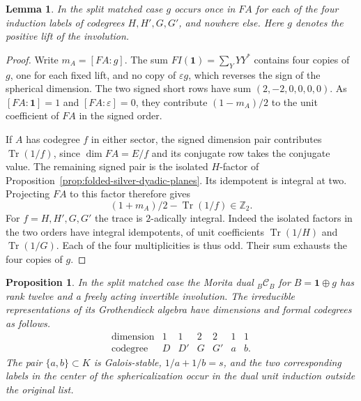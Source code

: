 \documentclass[11pt,reqno]{amsart}
\newtheorem{proposition}[theorem]{Proposition}
\newtheorem{lemma}[theorem]{Lemma}
\theoremstyle{remark}\newtheorem{remark}[theorem]{Remark}
\numberwithin{equation}{section}
\begin{document}
\begin{lemma}\label{prop:common-four-allocation}
In the split matched case $g$ occurs once in $F A$ for each of the
four induction labels of codegrees $H,H',G,G'$, and nowhere else.
Here $g$ denotes the positive lift of the involution.
\end{lemma}
\begin{proof}
Write $m_A=[FA:g]$. The sum $FI(\mathbf1)=\sum_Y YY^*$ contains
four copies of $g$, one for each fixed lift, and no copy of
$\varepsilon g$, which reverses the sign of the spherical dimension.
The two signed short rows have sum $(2,-2,0,0,0,0)$.
As $[FA:\mathbf1]=1$ and $[FA:\varepsilon]=0$, they contribute
$(1-m_A)/2$ to the unit coefficient of $FA$ in the signed order.

If $A$ has codegree $f$ in either sector, the signed dimension pair
contributes $\operatorname{Tr}(1/f)$, since $\dim FA=E/f$ and its
conjugate row takes the conjugate value. The remaining signed pair
is the isolated $H$-factor of
Proposition~\ref{prop:folded-silver-dyadic-planes}. Its idempotent
is integral at two. Projecting $FA$ to this factor therefore gives
\[
          (1+m_A)/2-\operatorname{Tr}(1/f)\in\mathbb Z_2 .
\]
For $f=H,H',G,G'$ the trace is $2$-adically integral. Indeed the
isolated factors in the two orders have integral idempotents, of
unit coefficients $\operatorname{Tr}(1/H)$ and $\operatorname{Tr}(1/G)$.
Each of the four multiplicities is thus odd. Their sum exhausts the
four copies of $g$.
\end{proof}

\begin{proposition}\label{prop:four-morita}
In the split matched case the Morita dual \({}_B\mathcal C_B\) for
$B=\mathbf1\oplus g$ has rank twelve and a freely acting invertible
involution. The irreducible representations of its Grothendieck algebra have
dimensions and formal codegrees as follows.
\[
\begin{array}{c|cccccc}
 \text{dimension}&1&1&2&2&1&1\\
 \text{codegree}&D&D'&G&G'&a&b .
\end{array}
\]
The pair $\{a,b\}\subset K$ is Galois-stable, $1/a+1/b=s$, and the
two corresponding labels in the center of the sphericalization occur
in the dual unit induction outside the original list.
\end{proposition}
\end{document}
